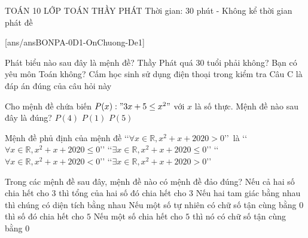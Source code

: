 
\begin{name}
	{\tenchude}
	{TOÁN 10}
	{LỚP TOÁN THẦY PHÁT}
	{Thời gian: 30 phút - Không kể thời gian phát đề}
\end{name}
\setcounter{page}{1}
\TN
{}[ans/ansBONPA-0D1-OnChuong-De1]
\begin{ex}%
Phát biểu nào sau đây là mệnh đề?
\choice
{Thầy Phát quá 30 tuổi phải không?}
{Bạn có yêu môn Toán không?}
{Cấm học sinh sử dụng điện thoại trong kiểm tra}
{\True Câu C là đáp án đúng của câu hỏi này}
\end{ex}

\begin{ex}%
Cho mệnh đề chứa biến $P(x):"3x+5\le x^2"$ với $x$ là số thực. Mệnh đề nào sau đây là đúng?
{$P(4)$}
{$P(1)$}
{\True $P(5)$}
\end{ex}

\begin{ex}%
Mệnh đề phủ định của mệnh đề \lq\lq$\forall x \in \mathbb{R}, x^{2}+x+2020>0$\rq\rq\ là
\choice
{\lq\lq$\forall x \in \mathbb{R}, x^{2}+x+2020 \leq 0$\rq\rq}
{\True \lq\lq$\exists x \in \mathbb{R}, x^{2}+x+2020 \leq 0 $\rq\rq}
{\lq\lq$\forall x \in \mathbb{R}, x^{2}+x+2020<0$\rq\rq}
{\lq\lq$\exists x \in \mathbb{R}, x^{2}+x+2020>0$\rq\rq}
\end{ex}
\begin{ex}%
Trong các mệnh đề sau đây, mệnh đề nào có mệnh đề đảo đúng?
\choice
{Nếu cả hai số chia hết cho $3$ thì tổng của hai số đó chia hết cho $3$}
{Nếu hai tam giác bằng nhau thì chúng có diện tích bằng nhau}
{Nếu một số tự nhiên có chữ số tận cùng bằng $0$ thì số đó chia hết cho $5$ }
{\True Nếu một số chia hết cho $5$ thì nó có chữ số tận cùng bằng $0$}
\end{ex}

